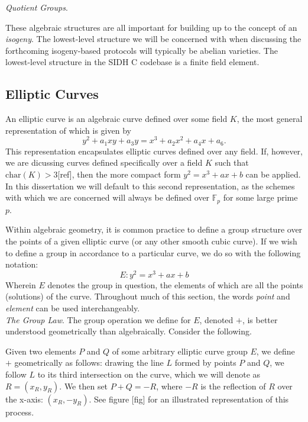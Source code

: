 \noindent
\emph{Quotient Groups}.

These algebraic structures are all important for building up to the concept of an \emph{isogeny}. The lowest-level structure we will be concerned with when discussing the forthcoming isogeny-based protocols will typically be abelian varieties. The lowest-level structure in the SIDH C codebase is a finite field element.\\

\subsection{Elliptic Curves}

An elliptic curve is an algebraic curve defined over some field $K$, the most general representation of which is given by
$$
y^2 + a_{1}xy + a_{3}y = x^3 + a_{2}x^2 + a_{4}x + a_6.
$$
This representation encapsulates elliptic curves defined over any field. If, however, we are dicussing curves defined specifically over a field $K$ such that $\text{char}(K) > 3$[ref], then the more compact form $y^2 = x^3 + ax + b$ can be applied. In this dissertation we will default to this second representation, as the schemes with which we are concerned will always be defined over $\mathbb{F}_p$ for some large prime $p$.

Within algebraic geometry, it is common practice to define a group structure over the points of a given elliptic curve (or any other smooth cubic curve). If we wish to define a group in accordance to a particular curve, we do so with the following notation:
$$
E: y^2 = x^3 + ax + b
$$
Wherein $E$ denotes the group in question, the elements of which are all the points (solutions) of the curve. Throughout much of this section, the words \emph{point} and \emph{element} can be used interchangeably.\\

\noindent
\emph{The Group Law}. The group operation we define for $E$, denoted $+$, is better understood geometrically than algebraically. Consider the following.

Given two elements $P$ and $Q$ of some arbitrary elliptic curve group $E$, we define $+$ geometrically as follows: drawing the line $L$ formed by points $P$ and $Q$, we follow $L$ to its third intersection on the curve, which we will denote as $R = (x_R, y_R)$. We then set $P + Q = -R$, where $-R$ is the reflection of $R$ over the x-axis: $(x_R, -y_R)$. See figure [fig] for an illustrated representation of this process.


